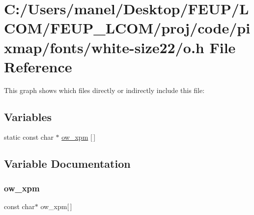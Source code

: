 \hypertarget{white-size22_2o_8h}{}\section{C\+:/\+Users/manel/\+Desktop/\+F\+E\+U\+P/\+L\+C\+O\+M/\+F\+E\+U\+P\+\_\+\+L\+C\+O\+M/proj/code/pixmap/fonts/white-\/size22/o.h File Reference}
\label{white-size22_2o_8h}
This graph shows which files directly or indirectly include this file\+:
\subsection*{Variables}
\begin{DoxyCompactItemize}
\item 
static const char $\ast$ \mbox{\hyperlink{white-size22_2o_8h_a24b5584c1f98f90ae6c348e87f19aea9}{ow\+\_\+xpm}} \mbox{[}$\,$\mbox{]}
\end{DoxyCompactItemize}


\subsection{Variable Documentation}
\mbox{\label{white-size22_2o_8h_a24b5584c1f98f90ae6c348e87f19aea9}} 
\subsubsection{\texorpdfstring{ow\_xpm}{ow\_xpm}}
{\footnotesize\ttfamily const char$\ast$ ow\+\_\+xpm\mbox{[}$\,$\mbox{]}\hspace{0.3cm}{\ttfamily [static]}}

